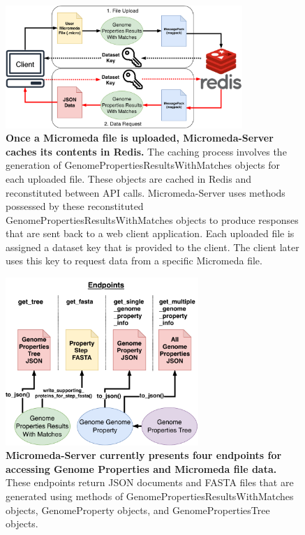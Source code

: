 \begin{figure}[!ht]
  \centering
	\includegraphics[width=0.80\textwidth]{media/Micromeda-Server-Workflow.pdf}
	 \caption[Once a Micromeda file is uploaded, Micromeda-Server caches its 
contents in Redis.]{\textbf{Once a Micromeda file is uploaded, Micromeda-Server 
caches its contents in Redis.} The caching process involves the generation of 
GenomePropertiesResultsWithMatches objects for each uploaded file. These objects 
are cached in Redis and reconstituted between API calls. Micromeda-Server uses 
methods possessed by these reconstituted GenomePropertiesResultsWithMatches 
objects to produce responses that are sent back to a web client application. 
Each uploaded file is assigned a dataset key that is provided to the client. The 
client later uses this key to request data from a specific Micromeda file.}
	 \label{fig:micromeda-server-workflow}
\end{figure}

\begin{figure}[!ht]
  \centering
	\includegraphics[width=0.65\textwidth]{media/Micromeda-Endpoints.pdf}
	 \caption[Micromeda-Server currently presents four endpoints for accessing 
Genome Properties and Micromeda file data.]{\textbf{Micromeda-Server currently 
presents four endpoints for accessing Genome Properties and Micromeda file 
data.} These endpoints return JSON documents and FASTA files that are generated 
using methods of GenomePropertiesResultsWithMatches objects, GenomeProperty 
objects, and GenomePropertiesTree objects.}
	 \label{fig:micromeda-endpoints}
\end{figure}

